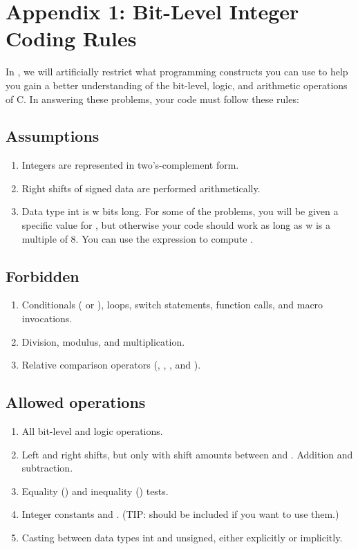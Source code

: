 
\section[Appendix 1]{Appendix 1: Bit-Level Integer Coding Rules}\label{app1}

In , we will artificially restrict what programming constructs you can use to help you gain a better understanding of the bit-level, logic, and arithmetic operations of C. 
In answering these problems, your code must follow these rules:

\subsection*{Assumptions}

\begin{enumerate}
    \item Integers are represented in two's-complement form.
    \item Right shifts of signed data are performed arithmetically.
    \item Data type int is w bits long. For some of the problems, you will be given a specific value for , but otherwise your code should work as long as w is a multiple of 8. You can use the expression  to compute .
\end{enumerate}

\subsection*{Forbidden}

\begin{enumerate}
    \item Conditionals ( or ), loops, switch statements, function calls, and macro invocations. 
    \item Division, modulus, and multiplication.
    \item Relative comparison operators (\code{<}, \code{>}, \code{<=}, and \code{>=}).
\end{enumerate}

\subsection*{Allowed operations}

\begin{enumerate}
    \item All bit-level and logic operations.
    \item Left and right shifts, but only with shift amounts between  and . Addition and subtraction.
    \item Equality (\code{==}) and inequality (\code{!=}) tests.
    \item Integer constants  and . (TIP:  should be included if you want to use them.)
    \item Casting between data types int and unsigned, either explicitly or implicitly.
\end{enumerate}

